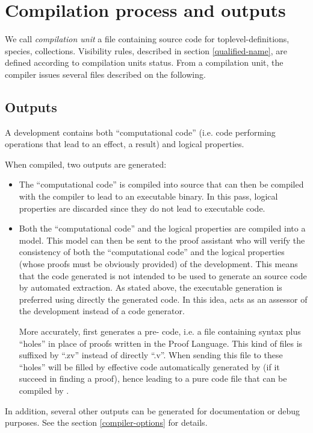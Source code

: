 
\section{Compilation process and outputs}

We call {\em compilation unit} a file
containing source code for toplevel-definitions, species,
collections. Visibility rules, described in section
\ref{qualified-name}, are defined according to compilation units status.
From a compilation unit, the compiler issues several files described
on the following.

\subsection{Outputs}
A {\focal} development contains both
``computational code'' (i.e. code performing operations that lead to
an effect, a result) and logical properties.

\smallskip
When compiled, two outputs are generated:
\begin{itemize}
  \item The ``computational code'' is compiled into {\ocaml} source
    that can then be compiled with the {\ocaml} compiler to lead to an
    executable binary. In this pass, logical properties are discarded
    since they do not lead to executable code.
  \item Both the ``computational code'' and the logical properties are
    compiled into a {\coq} model. This model can then be sent to the
    {\coq} proof assistant who will verify the consistency of both the
    ``computational code'' and the logical properties (whose
    proofs must be obviously provided) of the
    {\focal} development. This means that the {\coq} code generated is
    not intended to be used to generate an {\ocaml} source code by
    automated extraction. As stated above, the executable generation
    is preferred using directly the generated {\ocaml} code. In this
    idea, {\coq} acts as an assessor of the development instead of a
    code generator.

    More accurately, {\focal} first generates a pre-{\coq} code, i.e. a
    file containing {\coq} syntax plus ``holes'' in place of proofs
    written in the {\focal} Proof Language. This kind of files is
    suffixed by ``.zv'' instead of directly ``.v''. When sending this
    file to {\zenon} these ``holes'' will be filled by effective
    {\coq} code automatically generated by {\zenon} (if it succeed in
    finding a proof), hence leading to a pure {\coq} code file that can
    be compiled by {\coq}.

\end{itemize}
In addition, several other outputs can be generated for documentation
or debug purposes. See the section \ref{compiler-options} for
details.

